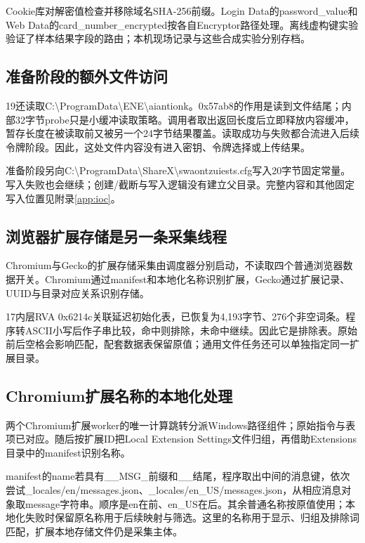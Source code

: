 \documentclass[UTF8,a4paper,zihao=5,fontset=windows]{ctexart}
\newcommand{\code}[1]{{\ttfamily\small #1}}
\begin{document}
Cookie库对解密值检查并移除域名SHA-256前缀。\code{Login Data}的\code{password\_value}和\code{Web Data}的\code{card\_number\_encrypted}按各自Encryptor路径处理。离线虚构键实验验证了样本结果字段的路由；本机现场记录与这些合成实验分别存档。\cite{cookies156,login156,payments156}

\subsection{准备阶段的额外文件访问}
19还读取\code{C:\textbackslash{}ProgramData\textbackslash{}ENE\textbackslash{}aiantionk}。\code{0x57ab8}的作用是读到文件结尾；内部32字节probe只是小缓冲读取策略。调用者取出返回长度后立即释放内容缓冲，暂存长度在被读取前又被另一个24字节结果覆盖。读取成功与失败都合流进入后续令牌阶段。因此，这处文件内容没有进入密钥、令牌选择或上传结果。

准备阶段另向\code{C:\textbackslash{}ProgramData\textbackslash{}ShareX\textbackslash{}swaontzuiests.cfg}写入20字节固定常量。写入失败也会继续；创建/截断与写入逻辑没有建立父目录。完整内容和其他固定写入位置见附录\ref{app:ioc}。

\subsection{浏览器扩展存储是另一条采集线程}
Chromium与Gecko的扩展存储采集由调度器分别启动，不读取四个普通浏览器数据开关。Chromium通过manifest和本地化名称识别扩展，Gecko通过扩展记录、UUID与目录对应关系识别存储。

17内层\code{RVA 0x6214c}关联延迟初始化表，已恢复为4,193字节、276个非空词条。程序转ASCII小写后作子串比较，命中则排除，未命中继续。因此它是排除表。原始前后空格会影响匹配，配套数据表保留原值；通用文件任务还可以单独指定同一扩展目录。

\subsection{Chromium扩展名称的本地化处理}
两个Chromium扩展worker的唯一计算跳转分派Windows路径组件；原始指令与表项已对应。随后按扩展ID把Local Extension Settings文件归组，再借助Extensions目录中的manifest识别名称。

manifest的name若具有\code{\_\_MSG\_}前缀和\code{\_\_}结尾，程序取出中间的消息键，依次尝试\code{\_locales/en/messages.json}、\code{\_locales/en\_US/messages.json}，从相应消息对象取message字符串。顺序是en在前、en\_US在后。其余普通名称按原值使用；本地化失败时保留原名称用于后续映射与筛选。这里的名称用于显示、归组及排除词匹配，扩展本地存储文件仍是采集主体。
\end{document}
